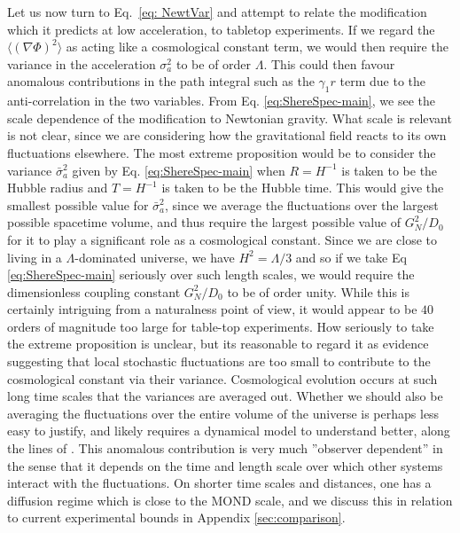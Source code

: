\documentclass[aps,pra,amsmath,amssymb,amsthm,floatfix,nofootinbib,notitlepage,superscriptaddress,10pt]{revtex4-2}
\begin{document}
Let us now turn to Eq.~\eqref{eq: NewtVar} and attempt to relate the modification which it predicts at low acceleration, to tabletop experiments. If we regard the
$\langle(\nabla\Phi)^2\rangle$ as acting like a cosmological constant term, we would then require the variance in the acceleration $\sigma_a^2$ to be of order $\Lambda$.
This could then favour anomalous contributions in the path integral such as the $\gamma_1 r$ term due to the anti-correlation in the two variables. From Eq. \eqref{eq:ShereSpec-main}, we see the scale dependence of the modification to Newtonian gravity. What scale is relevant is not clear, since we are considering how the gravitational field reacts to its own fluctuations elsewhere. The most extreme proposition would be to consider the variance $\bar{\sigma}_a^2$ given by Eq. \eqref{eq:ShereSpec-main} when $R=H^{-1}$ is taken to be the Hubble radius and $T=H^{-1}$ is taken to be the Hubble time. This would give the smallest possible value for $\bar{\sigma}_a^2$, since we average the fluctuations over the largest possible spacetime volume, and thus require the largest possible value of $G_N^2/D_0$ for it to play a significant role as a cosmological constant. Since we are close to living in a $\Lambda$-dominated universe, we have $H^2=\Lambda/3$ and so if we take Eq \eqref{eq:ShereSpec-main} seriously over such length scales, we would require the dimensionless coupling constant $G_N^2/D_{0}$ to be of order unity. While this is certainly intriguing from a naturalness point of view, it would appear to be $40$ orders of magnitude  too large for table-top experiments. How seriously to take the extreme proposition is unclear, but its reasonable to regard it as evidence suggesting that local stochastic fluctuations are too small to contribute to the cosmological constant via their variance. Cosmological evolution occurs at such long time scales that the variances are averaged out. Whether we should also be averaging the fluctuations over the entire volume of the universe is perhaps less easy to justify, and likely requires a dynamical model to understand better, along the lines of \cite{UCLcosmo}. This anomalous contribution is very much ''observer dependent'' in the sense that it depends on the time and length scale over which other systems interact with the fluctuations. On shorter time scales and distances, one has a diffusion regime which is close to the MOND scale, and we discuss this in relation to current experimental bounds in Appendix \ref{sec:comparison}. 
\end{document}
